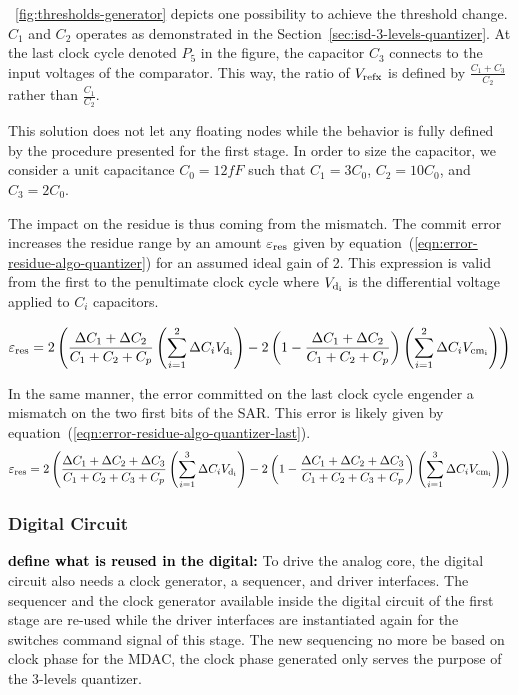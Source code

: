 \figurename~\ref{fig:thresholds-generator} depicts one possibility to achieve the threshold change. \(C_1\) and \(C_2\) operates as demonstrated in the Section~\ref{sec:isd-3-levels-quantizer}. At the last clock cycle denoted \(P_5\) in the figure, the capacitor \(C_3\) connects to the input voltages of the comparator. This way, the ratio of \(V_{\rm refx}\) is defined by \(\frac{C_1+C_3}{C_2}\) rather than \(\frac{C_1}{C_2}\).

This solution does not let any floating nodes while the behavior is fully defined by the procedure presented for the first stage. In order to size the capacitor, we consider a unit capacitance \(C_0 = 12 fF\) such that \(C_1 = 3 C_0\), \(C_2 = 10 C_0\), and \(C_3 = 2 C_0\).

The impact on the residue is thus coming from the mismatch. The commit error increases the residue range by an amount \(\varepsilon_{\rm res}\) given by equation~(\ref{eqn:error-residue-algo-quantizer}) for an assumed ideal gain of 2. This expression is valid from the first to the penultimate clock cycle where \(V_{\rm d_i}\) is the differential voltage applied to \(C_i\) capacitors.

\begin{equation}
	\label{eqn:error-residue-algo-quantizer}
	\varepsilon_{\rm res} = 2\left(\frac{\Delta C_1 + \Delta C_2}{C_1+C_2+C_p}\left(\sum_{i=1}^{2}{\Delta C_i V_{\rm d_i}}\right)
	- 2\left(1-\frac{\Delta C_1 + \Delta C_2}{C_1+C_2+C_p}\right)\left(\sum_{i=1}^{2}{\Delta C_i V_{\rm cm_i}}\right)\right)
\end{equation}

In the same manner, the error committed on the last clock cycle engender a mismatch on the two first bits of the SAR\@. This error is likely given by equation~(\ref{eqn:error-residue-algo-quantizer-last}).
\begin{equation}
	\label{eqn:error-residue-algo-quantizer-last}
	\varepsilon_{\rm res} = 2\left(\frac{\Delta C_1 + \Delta C_2 + \Delta C_3}{C_1+C_2+C_3+C_p}\left(\sum_{i=1}^{3}{\Delta C_i V_{\rm d_i}}\right)
	- 2\left(1-\frac{\Delta C_1 + \Delta C_2 + \Delta C_3}{C_1+C_2+C_3+C_p}\right)\left(\sum_{i=1}^{3}{\Delta C_i V_{\rm cm_i}}\right)\right)
\end{equation}

	\subsubsection{Digital Circuit}         %
\textbf{\textcolor{black}{define what is reused in the digital:}}
To drive the analog core, the digital circuit also needs a clock generator, a sequencer, and driver interfaces. The sequencer and the clock generator available inside the digital circuit of the first stage are re-used while the driver interfaces are instantiated again for the switches command signal of this stage. The new sequencing no more be based on clock phase for the MDAC, the clock phase generated only serves the purpose of the 3-levels quantizer.

